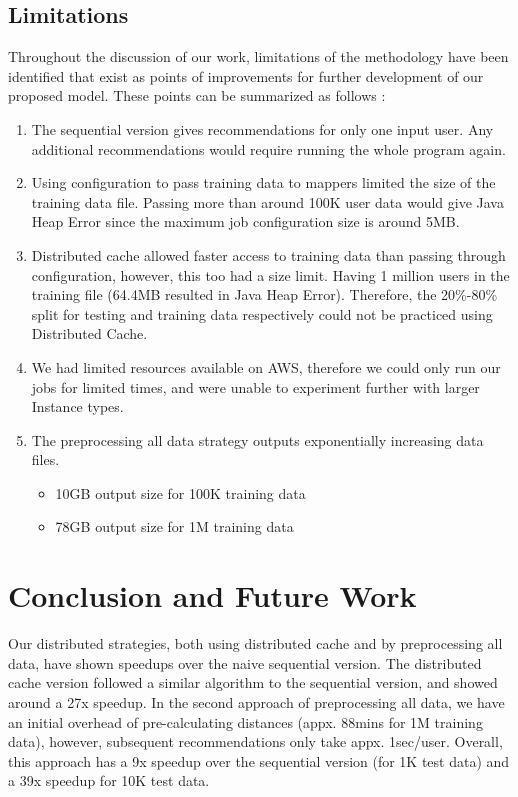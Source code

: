 \documentclass[conference, 12pt]{IEEEtran}
\newenvironment{renum}
  {\begin{enumerate}\renewcommand\labelenumi{(\roman{enumi})}}
  {\end{enumerate}}
\begin{document}
\subsection{Limitations}

Throughout the discussion of our work, limitations of the methodology have been identified that exist as points of improvements for further development of our proposed model. These points can be summarized as follows : 
\begin{renum}
\item The sequential version gives recommendations for only one input user. Any additional recommendations would require running the whole program again.

\item Using configuration to pass training data to mappers limited the size of the training data file. Passing more than around 100K user data would give Java Heap Error since the maximum job configuration size is around 5MB.

\item Distributed cache allowed faster access to training data than passing through configuration, however, this too had a size limit. Having 1 million users in the training file (64.4MB resulted in  Java Heap Error). Therefore, the 20\%-80\% split for testing and training data respectively could not be practiced using Distributed Cache.

\item We had limited resources available on AWS, therefore we could only run our jobs for limited times,  and were unable to experiment further with larger Instance types.

\item The preprocessing all data strategy outputs exponentially increasing data files. 
\begin{itemize}
\item  10GB output size for 100K training data
\item  78GB output size for 1M training data
\end{itemize} 
\end{renum}



\section{Conclusion and Future Work}

Our distributed strategies, both using distributed cache and by preprocessing all data, have shown speedups over the naive sequential version. The distributed cache version followed a similar algorithm to the sequential version, and showed around a 27x speedup. In the second approach of preprocessing all data, we have an initial overhead of pre-calculating distances (appx. 88mins for 1M training data), however, subsequent recommendations only take appx. 1sec/user. Overall, this approach has a 9x speedup over the sequential version (for 1K test data) and a 39x speedup for 10K test data.
\end{document}
